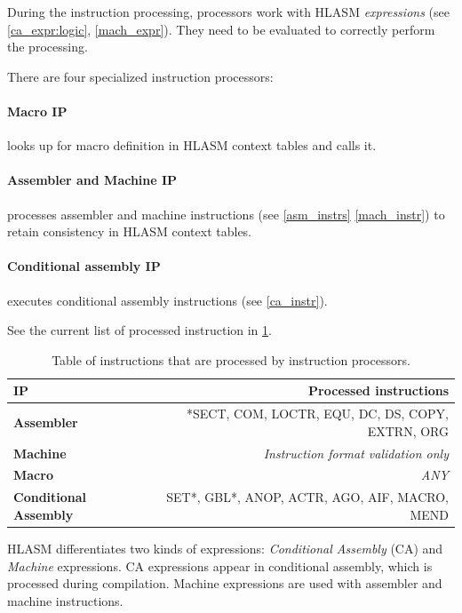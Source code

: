 During the instruction processing, processors work with HLASM \emph{expressions} (see \cref{ca_expr:logic}, \cref{mach_expr}). They need to be evaluated to correctly perform the processing.

There are four specialized instruction processors:
\paragraph*{Macro IP} looks up for macro definition in HLASM context tables and calls it.
\paragraph*{Assembler and Machine IP} processes assembler and machine instructions (see \cref{asm_instrs} \cref{mach_instr}) to retain consistency in HLASM context tables.

\paragraph*{Conditional assembly IP} executes conditional assembly instructions (see \cref{ca_instr}). 

\vspace{5mm}

See the current list of processed instruction in \cref{tab06:instr_proc}.

\begin{table}
	\centering
	\begin{tabular}{lr}
		\textbf{IP}                   &                  \textbf{Processed instructions} \\ \toprule
		\textbf{Assembler}            & *SECT, COM, LOCTR, EQU, DC, DS, COPY, EXTRN, ORG \\
		\textbf{Machine}              &        \emph{Instruction format validation only} \\
		\textbf{Macro}                &                                       \emph{ANY} \\
		\textbf{Conditional Assembly} &    SET*, GBL*, ANOP, ACTR, AGO, AIF, MACRO, MEND \\ \bottomrule
	\end{tabular}
	\caption{Table of instructions that are processed by instruction processors.}
	\label{tab06:instr_proc}
\end{table}

HLASM differentiates two kinds of expressions: \emph{Conditional Assembly} (CA) and \emph{Machine} expressions. CA expressions appear in conditional assembly, which is processed during compilation. Machine expressions are used with assembler and machine instructions.

